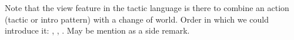 Note that the view feature in the tactic language is there to combine an
action (tactic or intro pattern) with a change of world. Order in
which we could introduce it: , ,
. May be mention  as a side remark.













